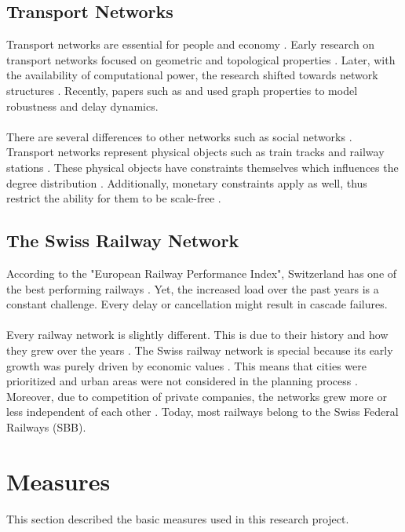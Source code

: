 \documentclass{Resources/netsci-project}
\begin{document}
\subsection{Transport Networks}
Transport networks are essential for people and economy \autocite{GraphSwiss} . Early research on transport networks focused on geometric and topological properties \autocite{GraphSwiss}. Later, with the availability of computational power, the research shifted towards network structures \autocite{GraphSwiss}. Recently, papers such as \textcite{Resilience} and \textcite{ComplexDelay} used graph properties to model robustness and delay dynamics.
\\~\\
There are several differences to other networks such as social networks \autocite{GraphSwiss}. Transport networks represent physical objects such as train tracks and railway stations \autocite{GraphSwiss}. These physical objects have constraints themselves which influences the degree distribution \autocite{GraphSwiss}. Additionally, monetary constraints apply as well, thus restrict the ability for them to be scale-free \autocite{GraphSwiss}.

\subsection{The Swiss Railway Network}
According to the "European Railway Performance Index", Switzerland has one of the best performing railways  \autocite{RailwayPerformanceIndex}. Yet, the increased load over the past years is a constant challenge. Every delay or cancellation might result in cascade failures.
\\~\\
Every railway network is slightly different. This is due to their history and how they grew over the years \autocite{GraphSwiss}. The Swiss railway network is special because its early growth was purely driven by economic values \autocite{GraphSwiss}. This means that cities were prioritized and urban areas were not considered in the planning process \autocite{GraphSwiss}. Moreover, due to competition of private companies, the networks grew more or less independent of each other \autocite{GraphSwiss}. Today, most railways belong to the Swiss Federal Railways (SBB).

\section{Measures}
This section described the basic measures used in this research project.
\end{document}
